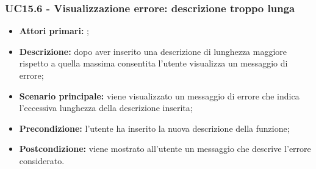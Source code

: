 \subsubsection{UC15.6 - Visualizzazione errore: descrizione troppo lunga}
\begin{itemize}
	\item \textbf{Attori primari:} \us{};
	\item \textbf{Descrizione:} dopo aver inserito una descrizione di lunghezza maggiore rispetto a quella massima consentita l’utente visualizza un messaggio di errore; 
	\item \textbf{Scenario principale:} viene visualizzato un messaggio di errore che indica l’eccessiva lunghezza della descrizione inserita;  
	\item \textbf{Precondizione:} l’utente ha inserito la nuova descrizione della funzione;  
	\item \textbf{Postcondizione:} viene mostrato all’utente un messaggio che descrive l’errore considerato.  
\end{itemize}